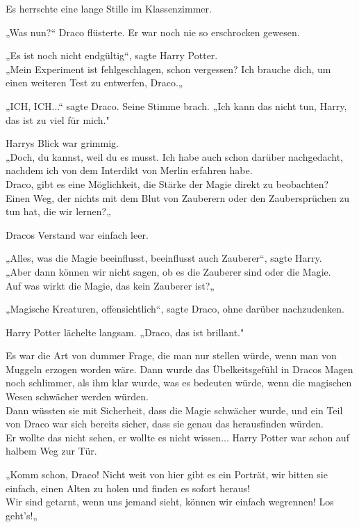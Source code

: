 {Es herrschte eine lange Stille im Klassenzimmer.

„Was nun?“ Draco flüsterte. Er war noch nie so erschrocken gewesen.

„Es ist noch nicht endgültig“, sagte Harry Potter.\\ „Mein Experiment ist fehlgeschlagen, schon vergessen? Ich brauche dich, um einen weiteren Test zu entwerfen, Draco.„

„ICH, ICH...“ sagte Draco. Seine Stimme brach. „Ich kann das nicht tun, Harry, das ist zu viel für mich."

Harrys Blick war grimmig.\\ „Doch, du kannst, weil du es musst. Ich habe auch schon darüber nachgedacht, nachdem ich von dem Interdikt von Merlin erfahren habe.\\ Draco, gibt es eine Möglichkeit, die Stärke der Magie direkt zu beobachten? Einen Weg, der nichts mit dem Blut von Zauberern oder den Zaubersprüchen zu tun hat, die wir lernen?„

Dracos Verstand war einfach leer.

„Alles, was die Magie beeinflusst, beeinflusst auch Zauberer“, sagte Harry.\\ „Aber dann können wir nicht sagen, ob es die Zauberer sind oder die Magie.\\ Auf was wirkt die Magie, das kein Zauberer ist?„

„Magische Kreaturen, offensichtlich“, sagte Draco, ohne darüber nachzudenken.

Harry Potter lächelte langsam. „Draco, das ist brillant."

Es war die Art von dummer Frage, die man nur stellen würde, wenn man von Muggeln erzogen worden wäre. Dann wurde das Übelkeitsgefühl in Dracos Magen noch schlimmer, als ihm klar wurde, was es bedeuten würde, wenn die magischen Wesen schwächer werden würden.\\ Dann wüssten sie mit Sicherheit, dass die Magie schwächer wurde, und ein Teil von Draco war sich bereits sicher, dass sie genau das herausfinden würden.\\ Er wollte das nicht sehen, er wollte es nicht wissen... Harry Potter war schon auf halbem Weg zur Tür.

„Komm schon, Draco! Nicht weit von hier gibt es ein Porträt, wir bitten sie einfach, einen Alten zu holen und finden es sofort heraus!\\ Wir sind getarnt, wenn uns jemand sieht, können wir einfach wegrennen! Los geht's!„

}
